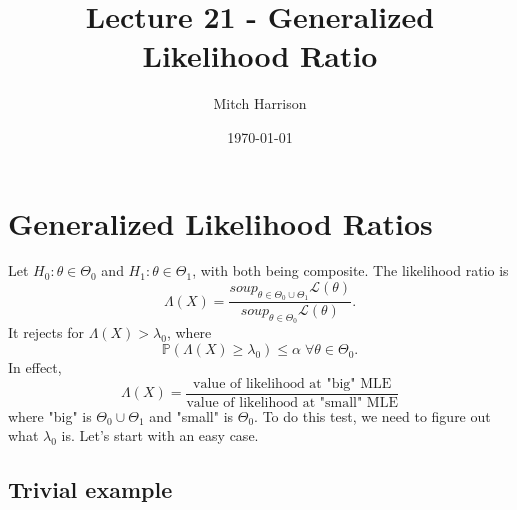 \documentclass[titlepage, 12pt, leqno]{article}
\title{\Huge{Lecture 21 - Generalized Likelihood Ratio}}
\author{\large{Mitch Harrison}}
\date{\today}
\begin{document}
\setlength{\parskip}{1\baselineskip}
\setlength{\parindent}{15pt}
\maketitle
\tableofcontents
\newpage


\section{Generalized Likelihood Ratios}

Let $H_{0}:\theta \in  \Theta_{0}$ and $H_{1}:\theta \in \Theta_{1}$, with
both being composite. The likelihood ratio is
\[
\Lambda(X) = \frac{soup_{\theta \in \Theta_{0} \cup \Theta_{1}}\mathcal{L}
(\theta)}{soup_{\theta \in \Theta_{0}}\mathcal{L}(\theta)}.
\]
It rejects for $\Lambda(X) > \lambda_{0}$, where
\[
\mathbb{P}(\Lambda(X)\ge \lambda_{0}) \le \alpha \; \forall \theta \in 
\Theta_{0}.
\]
In effect,
\[
\Lambda(X) = \frac{ \text{value of likelihood at "big" MLE}}{
 \text{value of likelihood at "small" MLE}}
\]
where "big" is $\Theta_{0} \cup \Theta_{1}$ and "small" is $\Theta_{0}$. To
do this test, we need to figure out what $\lambda_{0}$ is. Let's start with an
easy case.

\subsection{Trivial example}
\end{document}
